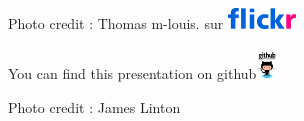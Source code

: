 \documentclass[newPxFont]{beamer}
\begin{document}
{
%
\begin{frame}
  \vspace{-1em}
  \begin{minipage}[t][.8\textheight]{\textwidth}

    \vfill

  \hfill \small{Photo credit : Thomas m-louis. sur \includegraphics[height=0.55cm]{img/flickr_logo}}
  \end{minipage}
  \vspace{-3em}
  \centering
	You can find this presentation on github\includegraphics[height=0.85cm]{img/github}

\end{frame}
}

{
%
\begin{frame}
  \vspace{-1em}
  \begin{minipage}[t][.8\textheight]{\textwidth}
    \color{\cnGrey}{\LARGE{~}}

    \vfill

  \hfill \small{Photo credit : James Linton}
  \end{minipage}

\end{frame}
}
\end{document}
